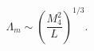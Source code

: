 \begin{equation}\label{eq:mcut}
\Lambda_m  \sim \left(\frac{M_4^2}{L}\right)^{1/3}.
\end{equation}

